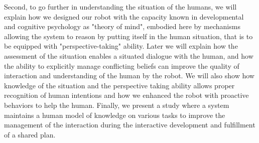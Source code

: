 \documentclass[a4paper,11pt,twoside]{StyleThese}
\begin{document}
Second, to go further in understanding the situation of the humans, 
we will explain how we designed our robot with the capacity known in 
developmental and cognitive psychology as "theory of mind",
embodied here by mechanisms allowing the system to reason by putting itself in the 
human situation, that is to be equipped with "perspective-taking" ability.
Later we will explain how the assessment of the situation enables 
a situated dialogue with the human, and how the ability to explicitly 
manage conflicting beliefs can improve the quality of interaction 
and understanding of the human by the robot.
We will also show how knowledge of the situation and the perspective taking ability allows proper recognition 
of human intentions and how we enhanced the robot 
with proactive behaviors to help the human.
Finally, we present a study where a system maintains a human model 
of knowledge on various tasks to improve the management of the 
interaction during the interactive development and fulfillment of a shared plan.
 

\ifdefined{}
\else


\end{document}

